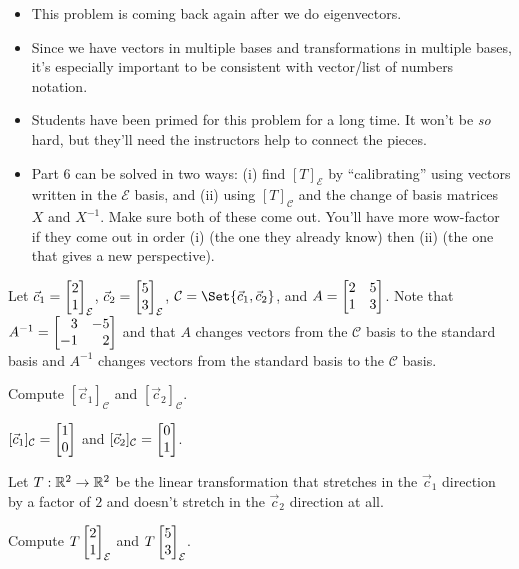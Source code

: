 \documentclass{workbook}
\begin{document}
\begin{slide}
\begin{annotation}
		\begin{notes}
			\begin{itemize}
				\item This problem is coming back again after we do eigenvectors.
				\item Since we have vectors in multiple bases and transformations in
					multiple bases, it's especially important to be consistent
					with vector/list of numbers notation.
				\item Students have been primed for this problem for a long time. It won't
					be \emph{so} hard, but they'll need the instructors help to connect the
					pieces.
				\item Part 6 can be solved in two ways: (i) find $[T]_{\mathcal E}$ by ``calibrating''
					using vectors written in the $\mathcal E$ basis, and (ii) using $[T]_{\mathcal C}$
					and the change of basis matrices $X$ and $X^{-1}$. Make sure both of these come out.
					You'll have more wow-factor if they come out in order (i) (the one
					they already know) then (ii) (the one that gives a new perspective).
			\end{itemize}
		\end{notes}
	\end{annotation}
	Let $\vec c_1=\mat{2\\1}_{\mathcal E}$, $\vec c_2=\mat{5\\3}_{\mathcal E}$, $\mathcal C=\Set{\vec c_1,\vec c_2}$, and $A=\mat{2&5\\1&3}$.
	Note that $A^{-1}=\mat{3&-5\\-1&2}$ and that $A$ changes vectors from the $\mathcal C$ basis to the standard
	basis and $A^{-1}$ changes vectors from the standard basis to the $\mathcal C$ basis.
	\begin{parts}
		\item Compute $[\vec c_1]_{\mathcal C}$ and $[\vec c_2]_{\mathcal C}$.
			\begin{solution}[inline]
				$[\vec c_1]_{\mathcal C}=\mat{1\\0}$ and
				$[\vec c_2]_{\mathcal C}=\mat{0\\1}$.
			\end{solution}
	\end{parts}
	Let $T:\mathbb{R}^2\to\mathbb{R}^2$ be the linear transformation that stretches in the $\vec c_1$ direction by a factor of $2$
	and doesn't stretch in the $\vec c_2$ direction at all.
	\begin{parts}[resume]
		\item Compute $T\mat{2\\1}_{\mathcal E}$ and $T\mat{5\\3}_{\mathcal E}$.

\end{parts}
\end{slide}
\end{document}
